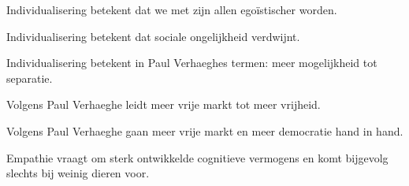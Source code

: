 \documentclass[main.tex]{subfiles}
\begin{document}
\begin{examenvraag}
\begin{stelling}
Individualisering betekent dat we met zijn allen egoïstischer worden.
\end{stelling}

\begin{antwoord}
\end{antwoord}
\end{examenvraag}


\begin{examenvraag}
\begin{stelling}
Individualisering betekent dat sociale ongelijkheid verdwijnt.
\end{stelling}

\begin{antwoord}
\end{antwoord}
\end{examenvraag}


\begin{examenvraag}
\begin{stelling}
Individualisering betekent in Paul Verhaeghes termen: meer mogelijkheid tot separatie.
\end{stelling}

\begin{antwoord}
\end{antwoord}
\end{examenvraag}


\begin{examenvraag}
\begin{stelling}
Volgens Paul Verhaeghe leidt meer vrije markt tot meer vrijheid.
\end{stelling}

\begin{antwoord}
\end{antwoord}
\end{examenvraag}


\begin{examenvraag}
\begin{stelling}
Volgens Paul Verhaeghe gaan meer vrije markt en meer democratie hand in hand.
\end{stelling}

\begin{antwoord}
\end{antwoord}
\end{examenvraag}


\begin{examenvraag}
\begin{stelling}
Empathie vraagt om sterk ontwikkelde cognitieve vermogens en komt bijgevolg slechts bij weinig dieren voor.
\end{stelling}

\begin{antwoord}
\end{antwoord}
\end{examenvraag}
\end{document}
